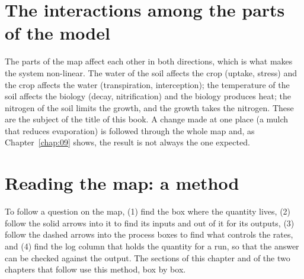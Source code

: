 \section{The interactions among the parts of the model}
The parts of the map affect each other in both directions, which is what makes the system non-linear. The water of the soil affects the crop (uptake, stress) and the crop affects the water (transpiration, interception); the temperature of the soil affects the biology (decay, nitrification) and the biology produces heat; the nitrogen of the soil limits the growth, and the growth takes the nitrogen. These  are the subject of the title of this book. A change made at one place (a mulch that reduces evaporation) is followed through the whole map and, as Chapter~\ref{chap:09} shows, the result is not always the one expected.

\section{Reading the map: a method}
To follow a question on the map, (1) find the box where the quantity lives, (2) follow the solid arrows into it to find its inputs and out of it for its outputs, (3) follow the dashed arrows into the process boxes to find what controls the rates, and (4) find the log column that holds the quantity for a run, so that the answer can be checked against the output. The sections of this chapter and of the two chapters that follow use this method, box by box.

